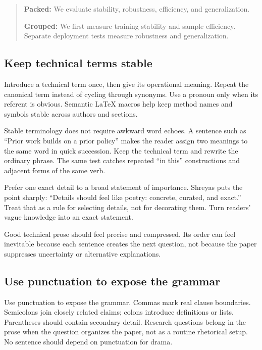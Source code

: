 \begin{quote}
\textbf{Packed:} We evaluate stability, robustness, efficiency, and
generalization.

\textbf{Grouped:} We first measure training stability and sample efficiency.
Separate deployment tests measure robustness and generalization.
\end{quote}

\subsection{Keep technical terms stable}

Introduce a technical term once, then give its operational meaning. Repeat the
canonical term instead of cycling through synonyms. Use a pronoun only when
its referent is obvious. Semantic LaTeX macros help keep method names and
symbols stable across authors and sections.

Stable terminology does not require awkward word echoes. A sentence such as
``Prior work builds on a prior policy'' makes the reader assign two meanings to
the same word in quick succession. Keep the technical term and rewrite the
ordinary phrase. The same test catches repeated ``in this'' constructions and
adjacent forms of the same verb.

Prefer one exact detail to a broad statement of importance. Shreyas puts the
point sharply: ``Details should feel like poetry: concrete, curated, and
exact.'' Treat that as a rule for selecting details, not for decorating them.
Turn readers' vague knowledge into an exact statement.

Good technical prose should feel precise and compressed. Its order can feel
inevitable because each sentence creates the next question, not because the
paper suppresses uncertainty or alternative explanations.

\subsection{Use punctuation to expose the grammar}

Use punctuation to expose the grammar. Commas mark real clause boundaries.
Semicolons join closely related claims; colons introduce definitions or lists.
Parentheses should contain secondary detail. Research questions belong in the
prose when the question organizes the paper, not as a routine rhetorical
setup. No sentence should depend on punctuation for drama.
